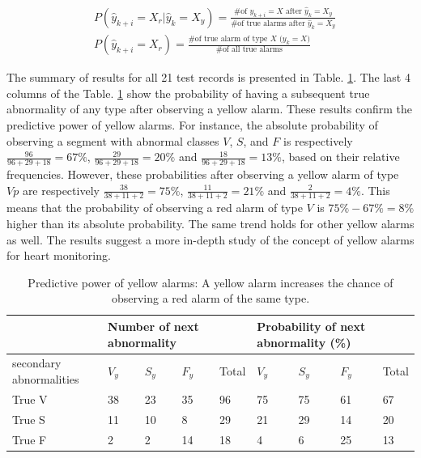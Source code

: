 \begin{align}
\nonumber 
&P(\hat{y}_{k+i}=X_r|\hat{y}_{k}=X_y)=\frac{\text{\# of $y_{k+i}=X$ after $\hat{y}_k=X_y$}}{\text{\# of true alarms after $\hat{y}_k=X_y$}} \\
&P(\hat{y}_{k+i}=X_r)=\frac{\text{\# of true alarm of type $X$ ($y_{k}=X$)}}{\text{\# of all true alarms}} 
\end{align}

The summary of results for all 21 test records is presented in Table. \ref{table:pred}. The last 4 columns of the Table. \ref{table:pred} show the probability of having a subsequent true abnormality of any type after observing a yellow alarm. %
These results confirm the predictive power of yellow alarms. 
For instance, the absolute probability of observing a segment with abnormal classes $V$, $S$, and $F$ is respectively $\frac{96}{96+29+18}=67\%$, $\frac{29}{96+29+18}=20\%$ and $\frac{18}{96+29+18}=13\%$, based on their relative frequencies. However, these probabilities after observing a yellow alarm of type $Vp$ are respectively $\frac{38}{38+11+2}=75\%$, $\frac{11}{38+11+2}=21\%$ and $\frac{2}{38+11+2}=4\%$. This means that the probability of observing a red alarm of type $V$ is $75\%-67\%=8\%$ higher than its absolute probability. The same trend holds for other yellow alarms as well. The results suggest a more in-depth study of the concept of yellow alarms for heart monitoring.

\begin{table}
	\caption{Predictive power of yellow alarms: A yellow alarm increases the chance of observing a red alarm of the same type.}
	\centering
	\begin{tabular}{|m{3.5em}|| m{1.4em} || m{1.4em} || m{1.4em} ||m{1.4em}|| m{1.4em} || m{1.4em} || m{1.4em} || m{1.4em}|}
		\hline
		& \multicolumn{3}{m{8em}}{Number of next abnormality }& &\multicolumn{3}{m{8em}}{Probability of next abnormality (\%)}  & \\ 
		\hline 
		secondary abnormalities & $V_y$ & $S_y$ & $F_y$ & Total & $V_y$ & $S_y$ & $F_y$ & Total \\ 
		\hline 
		True V & 38 & 23 & 35& 96 & 75 & 75 & 61 & 67 \\ 
		\hline 
		True S & 11 & 10 & 8 & 29 & 21 & 29 & 14& 20 \\ 
		\hline 
		True F & 2 & 2 & 14 & 18 & 4 & 6 & 25 & 13 \\ 
		\hline 
	\end{tabular} 
	\label{table:pred}
\end{table}


